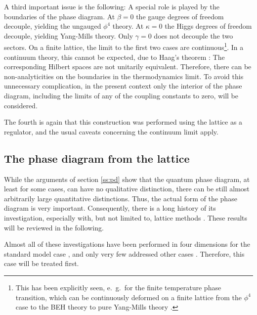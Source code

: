 \documentclass[final,12pt,3p,longtitle]{elsarticle}
\newcommand*{\1}{1\!\!\!\bot}
\begin{document}
A third important issue is the following: A special role is played by the boundaries of the phase diagram. At $\beta=0$ the gauge degrees of freedom decouple, yielding the ungauged $\phi^4$ theory. At $\kappa=0$ the Higgs degrees of freedom decouple, yielding Yang-Mills theory. Only $\gamma=0$ does not decouple the two sectors. On a finite lattice, the limit to the first two cases are continuous\footnote{This has been explicitly seen, e.\ g.\ for the finite temperature phase transition, which can be continuously deformed on a finite lattice from the $\phi^4$ case to the BEH theory to pure Yang-Mills theory \cite{Wellegehausen:2011sc}.}. In a continuum theory, this cannot be expected, due to Haag's theorem \cite{Haag:1992hx}: The corresponding Hilbert spaces are not unitarily equivalent. Therefore, there can be non-analyticities on the boundaries in the thermodynamics limit. To avoid this unnecessary complication, in the present context only the interior of the phase diagram, including the limits of any of the coupling constants to zero, will be considered.

The fourth is again that this construction was performed using the lattice as a regulator, and the usual caveats concerning the continuum limit apply.

\subsection{The phase diagram from the lattice}\label{ss:pdlat}

While the arguments of section \ref{ss:pd} show that the quantum phase diagram, at least for some cases, can have no qualitative distinction, there can be still almost arbitrarily large quantitative distinctions. Thus, the actual form of the phase diagram is very important. Consequently, there is a long history of its investigation, especially with, but not limited to, lattice methods \cite{Lang:1981qg,Kikugawa:1982yh,Brower:1982yn,Kuhnelt:1983mw,Gerdt:1984ft,Evertz:1985fc,Langguth:1985eu,Langguth:1985dr,Gerdt:1985rb,Gerdt:1985xh,Olynyk:1985tr,Munehisa:1986jc,Evertz:1986vp,Hasenfratz:1986za,Bock:1989fk,Heller:1993yv,Campos:1997dc,Knechtli:1998gf,Knechtli:1999qe,Caudy:2007sf,Greensite:2008ss,Bonati:2009pf,Bonati:2009yi,Wurtz:2009gf,Lewis:2010ps,Maas:2014pba,Gongyo:2014jfa,Gies:2015lia,Biswal:2015rul,Maas:2016ngo,Gies:2016kkk}. These results will be reviewed in the following.

Almost all of these investigations have been performed in four dimensions for the standard model case \cite{Kuhnelt:1983mw,Gerdt:1984ft,Evertz:1985fc,Langguth:1985eu,Langguth:1985dr,Gerdt:1985rb,Munehisa:1986jc,Evertz:1986vp,Hasenfratz:1986za,Bock:1989fk,Heller:1993yv,Campos:1997dc,Knechtli:1998gf,Knechtli:1999qe,Caudy:2007sf,Greensite:2008ss,Bonati:2009pf,Bonati:2009yi,Maas:2014pba,Gies:2015lia,Biswal:2015rul,Gies:2016kkk}, and only very few addressed other cases \cite{Kikugawa:1982yh,Brower:1982yn,Gupta:1983zv,Gerdt:1985xh,Olynyk:1985tr,Lee:1985yi,Shrock:1986fg,Shrock:1986bu,Gongyo:2014jfa,Maas:2016ngo,Lewis:2010ps,Wurtz:2009gf}. Therefore, this case will be treated first.
\end{document}
